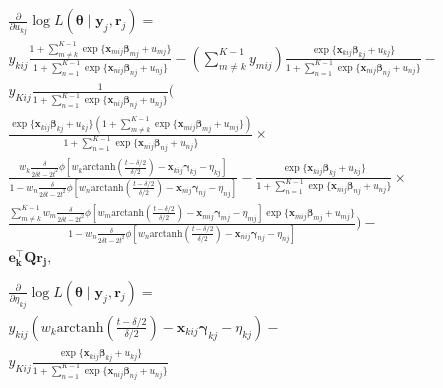 \documentclass[12pt, %
               openright, %
               oneside, %
               a4paper, %
               chapter=TITLE, %
               section=TITLE, %
               brazil,
               english %
]{abntex2}
\begin{document}
\begin{apendicesenv}
\begin{align*}
  &\frac{\partial}{\partial u_{kj}}
    \log L(\bm{\theta}\mid\bm{y}_{j}, \bm{r}_{j}) =\\
  &y_{kij}\frac{1 +
    \sum_{m \neq k}^{K-1}\exp\{\bm{x}_{mij}\bm{\beta}_{mj} + u_{mj}\}
    }{1 +
    \sum_{n = 1}^{K-1}\exp\{\bm{x}_{nij}\bm{\beta}_{nj} + u_{nj}\}} -
    \left(\sum_{m \neq k}^{K-1} y_{mij}\right)
    \frac{\exp\{\bm{x}_{kij}\bm{\beta}_{kj} + u_{kj}\}
    }{1 +
    \sum_{n = 1}^{K-1}\exp\{\bm{x}_{nij}\bm{\beta}_{nj} + u_{nj}\}}-\\
  &y_{Kij}\frac{1}{1 +
    \sum_{n = 1}^{K-1}\exp\{\bm{x}_{nij}\bm{\beta}_{nj} + u_{nj}\}
    }\Bigg(\\
  &\frac{\exp\{\bm{x}_{kij}\bm{\beta}_{kj} + u_{kj}\}
    \left(1 +
    \sum_{m \neq k}^{K-1}\exp\{\bm{x}_{mij}\bm{\beta}_{mj} + u_{mj}\}
    \right)}{
    1 + \sum_{n = 1}^{K-1}\exp\{\bm{x}_{nij}\bm{\beta}_{nj} + u_{nj}\}
    }\times\\
  &\frac{w_{k}\frac{\delta}{2\delta t - 2t^{2}}
    \phi[w_{k}\text{arctanh}\left(\frac{t-\delta/2}{\delta/2}\right)
    - \bm{x}_{kij}\bm{\gamma}_{kj} - \eta_{kj}
    ]}{1 - w_{n}\frac{\delta}{2\delta t - 2t^{2}}
    \phi[w_{n}\text{arctanh}\left(\frac{t-\delta/2}{\delta/2}\right)
    - \bm{x}_{nij}\bm{\gamma}_{nj} - \eta_{nj}]} -
    \frac{\exp\{\bm{x}_{kij}\bm{\beta}_{kj} + u_{kj}\}}{
    1 + \sum_{n = 1}^{K-1}\exp\{\bm{x}_{nij}\bm{\beta}_{nj} + u_{nj}\}}
    \times\\
  &\frac{
    \sum_{m \neq k}^{K-1}
    w_{m}\frac{\delta}{2\delta t - 2t^{2}}
    \phi[w_{m}\text{arctanh}\left(\frac{t-\delta/2}{\delta/2}\right)
    - \bm{x}_{mij}\bm{\gamma}_{mj} - \eta_{mj}]
    \exp\{\bm{x}_{mij}\bm{\beta}_{mj} + u_{mj}\}}{
    1 - w_{n}\frac{\delta}{2\delta t - 2t^{2}}
    \phi[w_{n}\text{arctanh}\left(\frac{t-\delta/2}{\delta/2}\right)
    - \bm{x}_{nij}\bm{\gamma}_{nj} - \eta_{nj}]}\Bigg) -\\
  &\bm{e_{k}^{\top}Qr_{j}},\\
  \\
  &\frac{\partial}{\partial \eta_{kj}}
  \log L(\bm{\theta}\mid\bm{y}_{j}, \bm{r}_{j}) =\\
  &y_{kij} (w_{k}\text{arctanh}\left(\frac{t-\delta/2}{\delta/2}\right)
    - \bm{x}_{kij}\bm{\gamma}_{kj} - \eta_{kj}) -\\
  &y_{Kij}\frac{\exp\{\bm{x}_{kij}\bm{\beta}_{kj} + u_{kj}\}
    }{1 + \sum_{n = 1}^{K-1}\exp\{\bm{x}_{nij}\bm{\beta}_{nj} + u_{nj}\}}

\end{align*}
\end{apendicesenv}
\end{document}
